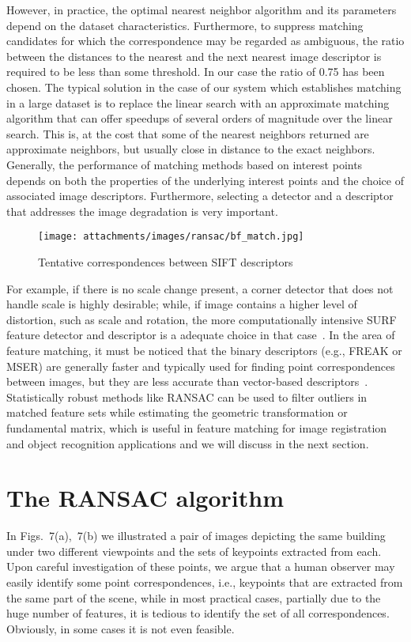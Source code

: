 However, in practice, the optimal nearest neighbor algorithm and its
parameters depend on the dataset characteristics. Furthermore, to suppress matching candidates for which the correspondence may be regarded as ambiguous, the ratio
between the distances to the nearest and the next nearest image descriptor is required to be less than some threshold. In our case the ratio of 0.75 has been chosen.
The typical solution in the case of our system which establishes matching in a large dataset is to replace the linear search with an approximate matching algorithm that can offer speedups of several
orders of magnitude over the linear search. This is, at the cost that some of the nearest neighbors returned are approximate neighbors, but usually close in distance to the
exact neighbors.
Generally, the performance of matching methods based on interest points depends
on both the properties of the underlying interest points and the choice of associated
image descriptors. Furthermore, selecting a detector and a descriptor that addresses the image degradation
is very important. 

\begin{figure}[htp!]
  \centering
  \texttt{[image: attachments/images/ransac/bf\_match.jpg]}
  \caption{Tentative correspondences between SIFT descriptors}
  \label{fig:bf_matches}
\end{figure}

For example, if there is no scale change present, a corner detector
that does not handle scale is highly desirable; while, if image contains a higher level
of distortion, such as scale and rotation, the more computationally intensive SURF feature detector and descriptor is a adequate choice in that case~\cite{hassaballah2016image}.
In the area of feature matching, it must be noticed that the binary descriptors (e.g., FREAK or MSER) are generally faster and typically used for finding point correspondences
between images, but they are less accurate than vector-based descriptors~\cite{figat2014performance}. Statistically robust methods like RANSAC can be used to filter outliers in matched feature
sets while estimating the geometric transformation or fundamental matrix, which is useful in feature matching for image registration and object recognition applications and we will discuss in the next section.



\section{The RANSAC algorithm}
In Figs.~7(a),~7(b) we illustrated a pair of images depicting the same building under two different viewpoints and the sets of keypoints extracted from each. Upon careful investigation of these points, we argue that a human observer may easily identify some point correspondences, i.e., keypoints that are extracted from the same part of the scene, while in most practical cases, partially due to the huge number  of features, it is tedious to identify the set of all correspondences. Obviously, in some cases it is not even feasible.

